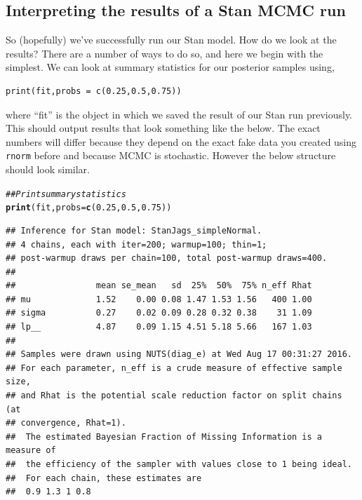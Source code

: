 \documentclass[11pt,fullpage]{book}
\makeatletter
\newenvironment{kframe}{%
	\def\at@end@of@kframe{}%
	\ifinner\ifhmode%
	\def\at@end@of@kframe{\end{minipage}}%
\begin{minipage}{\columnwidth}%
	\fi\fi%
	\def\FrameCommand##1{\hskip\@totalleftmargin \hskip-\fboxsep
		\colorbox{shadecolor}{##1}\hskip-\fboxsep
		\hskip-\linewidth \hskip-\@totalleftmargin \hskip\columnwidth}%
	\MakeFramed {\advance\hsize-\width
		\@totalleftmargin\z@ \linewidth\hsize
		\@setminipage}}%
{\par\unskip\endMakeFramed%
	\at@end@of@kframe}
\newcommand{\hlnum}[1]{\textcolor[rgb]{0.686,0.059,0.569}{#1}}%
\newcommand{\hlcom}[1]{\textcolor[rgb]{0.678,0.584,0.686}{\textit{#1}}}%
\newcommand{\hlstd}[1]{\textcolor[rgb]{0.345,0.345,0.345}{#1}}%
\newcommand{\hlkwc}[1]{\textcolor[rgb]{0.333,0.667,0.333}{#1}}%
\newcommand{\hlkwd}[1]{\textcolor[rgb]{0.737,0.353,0.396}{\textbf{#1}}}%
\newenvironment{knitrout}{}{} %
\makeatother
\begin{document}
\subsection{Interpreting the results of a Stan MCMC run}
So (hopefully) we've successfully run our Stan model. How do we look at the results? There are a number of ways to do so, and here we begin with the simplest. We can look at summary statistics for our posterior samples using,
\begin{verbatim}
print(fit,probs = c(0.25,0.5,0.75))
\end{verbatim}
where ``fit'' is the object in which we saved the result of our Stan run previously. This should output results that look something like the below. The exact numbers will differ because they depend on the exact fake data you created using \texttt{rnorm} before and because MCMC is stochastic. However the below structure should look similar.

\begin{knitrout}\small
		\color{fgcolor}\begin{kframe}
			\begin{alltt}
				\hlcom{## Print summary statistics}
				\hlkwd{print}\hlstd{(fit,}\hlkwc{probs} \hlstd{=} \hlkwd{c}\hlstd{(}\hlnum{0.25}\hlstd{,} \hlnum{0.5}\hlstd{,} \hlnum{0.75}\hlstd{))}
			\end{alltt}
			\begin{verbatim}
## Inference for Stan model: StanJags_simpleNormal.
## 4 chains, each with iter=200; warmup=100; thin=1; 
## post-warmup draws per chain=100, total post-warmup draws=400.
## 
##                mean se_mean   sd  25%  50%  75% n_eff Rhat
## mu             1.52    0.00 0.08 1.47 1.53 1.56   400 1.00
## sigma          0.27    0.02 0.09 0.28 0.32 0.38    31 1.09
## lp__           4.87    0.09 1.15 4.51 5.18 5.66   167 1.03
## 
## Samples were drawn using NUTS(diag_e) at Wed Aug 17 00:31:27 2016.
## For each parameter, n_eff is a crude measure of effective sample size,
## and Rhat is the potential scale reduction factor on split chains (at 
## convergence, Rhat=1).
##  The estimated Bayesian Fraction of Missing Information is a measure of
##  the efficiency of the sampler with values close to 1 being ideal.
##  For each chain, these estimates are
##  0.9 1.3 1 0.8
			\end{verbatim}
		\end{kframe}
	\end{knitrout}
\end{document}

